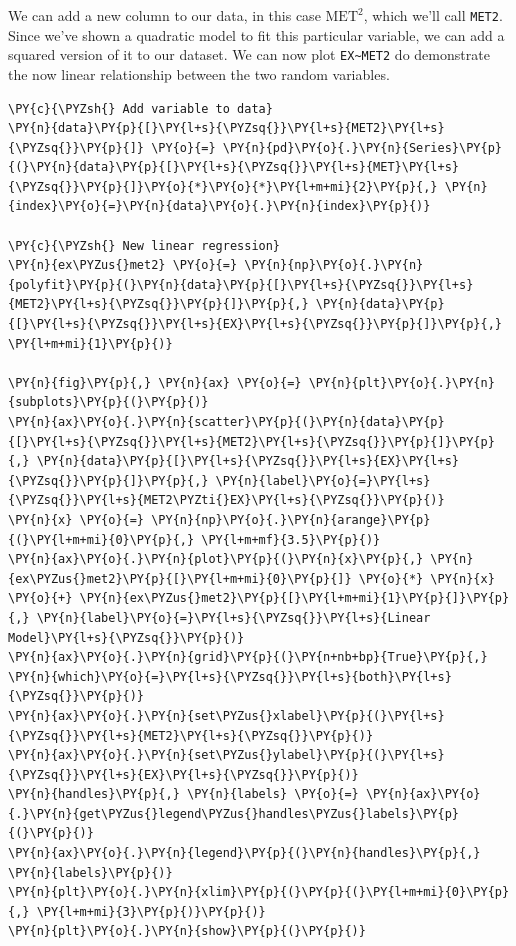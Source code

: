 \documentclass[10pt]{article}\usepackage[]{graphicx}\usepackage[]{xcolor}
\begin{document}
We can add a new column to our data, in this case $\text{MET}^2$, which we'll call \texttt{MET2}. Since we've shown a
quadratic model to fit this particular variable, we can add a squared version of it to our dataset. We can now plot
\texttt{EX\textasciitilde{}MET2} do demonstrate the now linear relationship between the two random variables.

    \begin{Verbatim}[commandchars=\\\{\}]
\PY{c}{\PYZsh{} Add variable to data}
\PY{n}{data}\PY{p}{[}\PY{l+s}{\PYZsq{}}\PY{l+s}{MET2}\PY{l+s}{\PYZsq{}}\PY{p}{]} \PY{o}{=} \PY{n}{pd}\PY{o}{.}\PY{n}{Series}\PY{p}{(}\PY{n}{data}\PY{p}{[}\PY{l+s}{\PYZsq{}}\PY{l+s}{MET}\PY{l+s}{\PYZsq{}}\PY{p}{]}\PY{o}{*}\PY{o}{*}\PY{l+m+mi}{2}\PY{p}{,} \PY{n}{index}\PY{o}{=}\PY{n}{data}\PY{o}{.}\PY{n}{index}\PY{p}{)}

\PY{c}{\PYZsh{} New linear regression}
\PY{n}{ex\PYZus{}met2} \PY{o}{=} \PY{n}{np}\PY{o}{.}\PY{n}{polyfit}\PY{p}{(}\PY{n}{data}\PY{p}{[}\PY{l+s}{\PYZsq{}}\PY{l+s}{MET2}\PY{l+s}{\PYZsq{}}\PY{p}{]}\PY{p}{,} \PY{n}{data}\PY{p}{[}\PY{l+s}{\PYZsq{}}\PY{l+s}{EX}\PY{l+s}{\PYZsq{}}\PY{p}{]}\PY{p}{,} \PY{l+m+mi}{1}\PY{p}{)}

\PY{n}{fig}\PY{p}{,} \PY{n}{ax} \PY{o}{=} \PY{n}{plt}\PY{o}{.}\PY{n}{subplots}\PY{p}{(}\PY{p}{)}
\PY{n}{ax}\PY{o}{.}\PY{n}{scatter}\PY{p}{(}\PY{n}{data}\PY{p}{[}\PY{l+s}{\PYZsq{}}\PY{l+s}{MET2}\PY{l+s}{\PYZsq{}}\PY{p}{]}\PY{p}{,} \PY{n}{data}\PY{p}{[}\PY{l+s}{\PYZsq{}}\PY{l+s}{EX}\PY{l+s}{\PYZsq{}}\PY{p}{]}\PY{p}{,} \PY{n}{label}\PY{o}{=}\PY{l+s}{\PYZsq{}}\PY{l+s}{MET2\PYZti{}EX}\PY{l+s}{\PYZsq{}}\PY{p}{)}
\PY{n}{x} \PY{o}{=} \PY{n}{np}\PY{o}{.}\PY{n}{arange}\PY{p}{(}\PY{l+m+mi}{0}\PY{p}{,} \PY{l+m+mf}{3.5}\PY{p}{)}
\PY{n}{ax}\PY{o}{.}\PY{n}{plot}\PY{p}{(}\PY{n}{x}\PY{p}{,} \PY{n}{ex\PYZus{}met2}\PY{p}{[}\PY{l+m+mi}{0}\PY{p}{]} \PY{o}{*} \PY{n}{x} \PY{o}{+} \PY{n}{ex\PYZus{}met2}\PY{p}{[}\PY{l+m+mi}{1}\PY{p}{]}\PY{p}{,} \PY{n}{label}\PY{o}{=}\PY{l+s}{\PYZsq{}}\PY{l+s}{Linear Model}\PY{l+s}{\PYZsq{}}\PY{p}{)}
\PY{n}{ax}\PY{o}{.}\PY{n}{grid}\PY{p}{(}\PY{n+nb+bp}{True}\PY{p}{,} \PY{n}{which}\PY{o}{=}\PY{l+s}{\PYZsq{}}\PY{l+s}{both}\PY{l+s}{\PYZsq{}}\PY{p}{)}
\PY{n}{ax}\PY{o}{.}\PY{n}{set\PYZus{}xlabel}\PY{p}{(}\PY{l+s}{\PYZsq{}}\PY{l+s}{MET2}\PY{l+s}{\PYZsq{}}\PY{p}{)}
\PY{n}{ax}\PY{o}{.}\PY{n}{set\PYZus{}ylabel}\PY{p}{(}\PY{l+s}{\PYZsq{}}\PY{l+s}{EX}\PY{l+s}{\PYZsq{}}\PY{p}{)}
\PY{n}{handles}\PY{p}{,} \PY{n}{labels} \PY{o}{=} \PY{n}{ax}\PY{o}{.}\PY{n}{get\PYZus{}legend\PYZus{}handles\PYZus{}labels}\PY{p}{(}\PY{p}{)}
\PY{n}{ax}\PY{o}{.}\PY{n}{legend}\PY{p}{(}\PY{n}{handles}\PY{p}{,} \PY{n}{labels}\PY{p}{)}
\PY{n}{plt}\PY{o}{.}\PY{n}{xlim}\PY{p}{(}\PY{p}{(}\PY{l+m+mi}{0}\PY{p}{,} \PY{l+m+mi}{3}\PY{p}{)}\PY{p}{)}
\PY{n}{plt}\PY{o}{.}\PY{n}{show}\PY{p}{(}\PY{p}{)}
\end{Verbatim}
\end{document}
